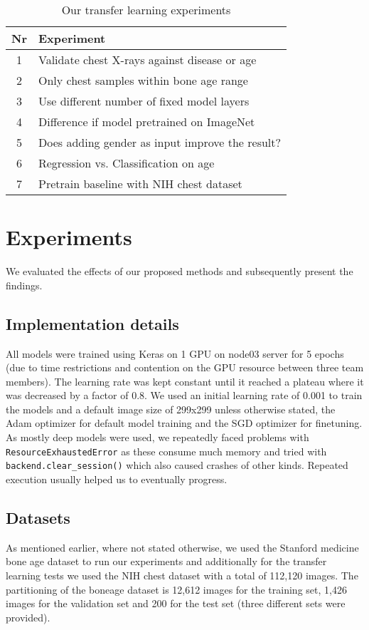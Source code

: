 \documentclass[10pt,twocolumn,letterpaper]{article}
\begin{document}
\begin{table}[h]
\begin{center}
\begin{tabular}{|c|l|}
\hline
Nr & Experiment \\
\hline\hline
1 & Validate chest X-rays against disease or age \\
2 & Only chest samples within bone age range \\
3 & Use different number of fixed model layers \\
4 & Difference if model pretrained on ImageNet \\
5 & Does adding gender as input improve the result? \\
6 & Regression vs. Classification on age \\
7 & Pretrain baseline \cite{kaggleboneage} with NIH chest dataset \\
\hline
\end{tabular}
\end{center}
\caption{Our transfer learning experiments}
\label{table:taexp}
\end{table}


\section{Experiments}
We evaluated the effects of our proposed methods and subsequently present the findings.

\subsection{Implementation details}
All models were trained using Keras \cite{keras} on 1 GPU on node03 server for 5 epochs (due to time restrictions and contention on the GPU resource between three team members). The learning rate was kept constant until it reached a plateau where it was decreased by a factor of 0.8. We used an initial learning rate of 0.001 to train the models and a default image size of 299x299 unless otherwise stated, the Adam optimizer for default model training and the SGD optimizer for finetuning. As mostly deep models were used, we repeatedly faced problems with \verb+ResourceExhaustedError+ as these consume much memory and tried with \verb+backend.clear_session()+ which also caused crashes of other kinds. Repeated execution usually helped us to eventually progress. 

\subsection{Datasets}
As mentioned earlier, where not stated otherwise, we used the Stanford medicine bone age dataset \cite{stanfordboneage} to run our experiments and additionally for the transfer learning tests we used the NIH chest dataset \cite{nihchestxray} with a total of 112,120 images. The partitioning of the boneage dataset is 12,612 images for the training set, 1,426 images for the validation set and 200 for the test set (three different sets were provided).
\end{document}
